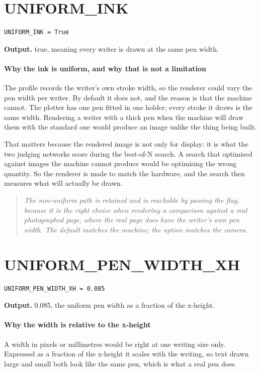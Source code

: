\section{UNIFORM\_INK}
\begin{lstlisting}[style=sig]
UNIFORM_INK = True
\end{lstlisting}

\noindent\textbf{Output.} true, meaning every writer is drawn at the same pen width.


\paragraph{Why the ink is uniform, and why that is not a limitation}
The profile records the writer's own stroke width, so the renderer could vary the pen width per writer. By default it does not, and the reason is that the machine cannot. The plotter has one pen fitted in one holder; every stroke it draws is the same width. Rendering a writer with a thick pen when the machine will draw them with the standard one would produce an image unlike the thing being built.

That matters because the rendered image is not only for display: it is what the two judging networks score during the best-of-N search. A search that optimised against images the machine cannot produce would be optimising the wrong quantity. So the renderer is made to match the hardware, and the search then measures what will actually be drawn.


\begin{quote}\small\itshape The non-uniform path is retained and is reachable by passing the flag, because it is the right choice when rendering a comparison against a real photographed page, where the real page does have the writer's own pen width. The default matches the machine; the option matches the camera.\end{quote}

\section{UNIFORM\_PEN\_WIDTH\_XH}
\begin{lstlisting}[style=sig]
UNIFORM_PEN_WIDTH_XH = 0.085
\end{lstlisting}

\noindent\textbf{Output.} 0.085, the uniform pen width as a fraction of the x-height.


\paragraph{Why the width is relative to the x-height}
A width in pixels or millimetres would be right at one writing size only. Expressed as a fraction of the x-height it scales with the writing, so text drawn large and small both look like the same pen, which is what a real pen does.


